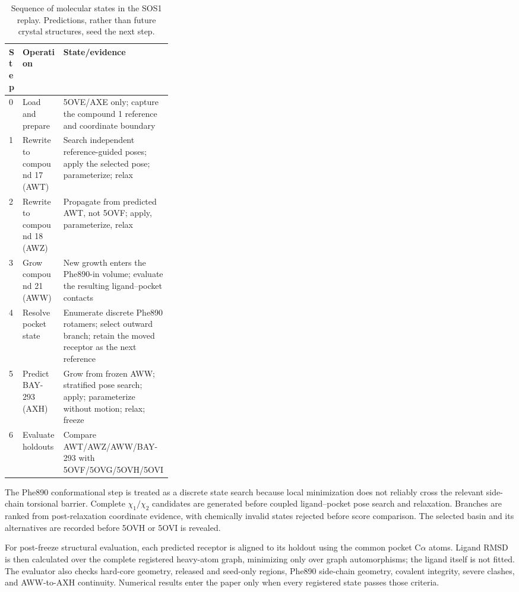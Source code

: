 \documentclass[11pt]{article}
\begin{document}
\begin{small}
\begin{table}[htbp]
\centering\small
\caption{Sequence of molecular states in the SOS1 replay. Predictions, rather than future crystal structures, seed the next step.}
\label{tab:appA_sos1_beats}
\begin{tabularx}{\linewidth}{@{}p{0.07\linewidth}p{0.25\linewidth}X@{}}
\toprule
\textbf{Step} & \textbf{Operation} & \textbf{State/evidence}\\
\midrule
0 & Load and prepare & 5OVE/AXE only; capture the compound 1 reference and coordinate boundary\\
1 & Rewrite to compound 17 (AWT) & Search independent reference-guided poses; apply the selected pose; parameterize; relax\\
2 & Rewrite to compound 18 (AWZ) & Propagate from predicted AWT, not 5OVF; apply, parameterize, relax\\
3 & Grow compound 21 (AWW) & New growth enters the Phe890-in volume; evaluate the resulting ligand--pocket contacts\\
4 & Resolve pocket state & Enumerate discrete Phe890 rotamers; select outward branch; retain the moved receptor as the next reference\\
5 & Predict BAY-293 (AXH) & Grow from frozen AWW; stratified pose search; apply; parameterize without motion; relax; freeze\\
6 & Evaluate holdouts & Compare AWT/AWZ/AWW/BAY-293 with 5OVF/5OVG/5OVH/5OVI\\
\bottomrule
\end{tabularx}
\end{table}

The Phe890 conformational step is treated as a discrete state search because local minimization does not reliably cross the relevant side-chain torsional barrier. Complete $\chi_1/\chi_2$ candidates are generated before coupled ligand--pocket pose search and relaxation. Branches are ranked from post-relaxation coordinate evidence, with chemically invalid states rejected before score comparison. The selected basin and its alternatives are recorded before 5OVH or 5OVI is revealed.

For post-freeze structural evaluation, each predicted receptor is aligned to its holdout using the common pocket C$\alpha$ atoms. Ligand RMSD is then calculated over the complete registered heavy-atom graph, minimizing only over graph automorphisms; the ligand itself is not fitted. The evaluator also checks hard-core geometry, released and seed-only regions, Phe890 side-chain geometry, covalent integrity, severe clashes, and AWW-to-AXH continuity. Numerical results enter the paper only when every registered state passes those criteria.


\end{small}
\end{document}
